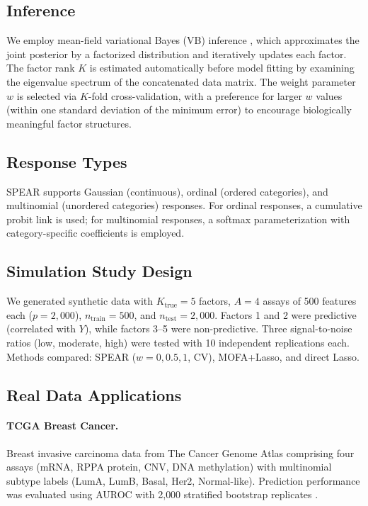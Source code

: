 \documentclass[11pt]{article}
\begin{document}
\subsection{Inference}

We employ mean-field variational Bayes (VB) inference \citep{blei2017variational, bishop1999variational}, which approximates the joint posterior by a factorized distribution and iteratively updates each factor. The factor rank $K$ is estimated automatically before model fitting by examining the eigenvalue spectrum of the concatenated data matrix. The weight parameter $w$ is selected via $K$-fold cross-validation, with a preference for larger $w$ values (within one standard deviation of the minimum error) to encourage biologically meaningful factor structures.

\subsection{Response Types}

SPEAR supports Gaussian (continuous), ordinal (ordered categories), and multinomial (unordered categories) responses. For ordinal responses, a cumulative probit link is used; for multinomial responses, a softmax parameterization with category-specific coefficients is employed.

\subsection{Simulation Study Design}

We generated synthetic data with $K_{\text{true}} = 5$ factors, $A = 4$ assays of 500 features each ($p = 2{,}000$), $n_{\text{train}} = 500$, and $n_{\text{test}} = 2{,}000$. Factors 1 and 2 were predictive (correlated with $Y$), while factors 3--5 were non-predictive. Three signal-to-noise ratios (low, moderate, high) were tested with 10 independent replications each. Methods compared: SPEAR ($w = 0, 0.5, 1$, CV), MOFA+Lasso, and direct Lasso.

\subsection{Real Data Applications}

\paragraph{TCGA Breast Cancer.} Breast invasive carcinoma data from The Cancer Genome Atlas \citep{cancer2012comprehensive} comprising four assays (mRNA, RPPA protein, CNV, DNA methylation) with multinomial subtype labels (LumA, LumB, Basal, Her2, Normal-like). Prediction performance was evaluated using AUROC with 2{,}000 stratified bootstrap replicates \citep{efron1994introduction}.
\end{document}
